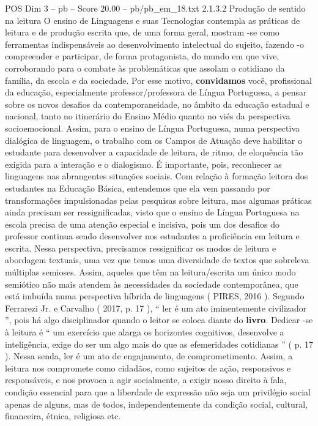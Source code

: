\begin{textsample}{POS Dim 3 – pb – Score 20.00 – pb/pb\_em\_18.txt}  \label{ex:f3_pos_090}
2.1.3.2 Produção de sentido na leitura O ensino de Linguagens e suas Tecnologias contempla as práticas de leitura e de produção escrita que, de uma forma geral, mostram -se como ferramentas indispensáveis ao desenvolvimento intelectual do sujeito, fazendo -o compreender e participar, de forma protagonista, do mundo em que vive, corroborando para o combate às problemáticas que assolam o cotidiano da família, da escola e da sociedade.
Por esse motivo, \textbf{convidamos} você, profissional da educação, especialmente professor/professora de Língua Portuguesa, a pensar sobre os novos desafios da contemporaneidade, no âmbito da educação estadual e nacional, tanto no itinerário do Ensino Médio quanto no viés da perspectiva socioemocional.
Assim, para o ensino de Língua Portuguesa, numa perspectiva dialógica de linguagem, o trabalho com os Campos de Atuação deve habilitar o estudante para desenvolver a capacidade de leitura, de ritmo, de eloquência tão exigida para a interação e o dialogismo.
É importante, pois, reconhecer as linguagens nas abrangentes situações sociais.
Com relação à formação leitora dos estudantes na Educação Básica, entendemos que ela vem passando por transformações impulsionadas pelas pesquisas sobre leitura, mas algumas práticas ainda precisam ser ressignificadas, visto que o ensino de Língua Portuguesa na escola precisa de uma atenção especial e incisiva, pois um dos desafios do professor continua sendo desenvolver nos estudantes a proficiência em leitura e escrita.
Nessa perspectiva, precisamos ressignificar os modos de leitura e abordagem textuais, uma vez que temos uma diversidade de textos que sobreleva múltiplas semioses.
Assim, aqueles que têm na leitura/escrita um único modo semiótico não mais atendem às necessidades da sociedade contemporânea, que está imbuída numa perspectiva híbrida de linguagens ( PIRES, 2016 ).
Segundo Ferrarezi Jr. e Carvalho ( 2017, p. 17 ), “ ler é um ato iminentemente civilizador ”, pois há algo disciplinador quando o leitor se coloca diante do \textbf{livro}.
Dedicar -se à leitura é “ um exercício que alarga os horizontes cognitivos, desenvolve a inteligência, exige do ser um algo mais do que as efemeridades cotidianas ” ( p. 17 ).
Nessa senda, ler é um ato de engajamento, de comprometimento.
Assim, a leitura nos compromete como cidadãos, como sujeitos de ação, responsivos e responsáveis, e nos provoca a agir socialmente, a exigir nosso direito à fala, condição essencial para que a liberdade de expressão não seja um privilégio social apenas de alguns, mas de todos, independentemente da condição social, cultural, financeira, étnica, religiosa etc.

\end{textsample}
